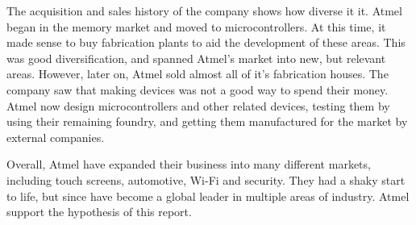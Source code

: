 The acquisition and sales history of the company shows how diverse it it.
Atmel began in the memory market and moved to microcontrollers. 
At this time, it made sense to buy fabrication plants to aid the development of these areas. 
This was good diversification, and spanned Atmel's market into new, but relevant areas.
However, later on, Atmel sold almost all of it's fabrication houses. 
The company saw that making devices was not a good way to spend their money. 
Atmel now design microcontrollers and other related devices, testing them by using their remaining foundry, and getting them manufactured for the market by external companies.

Overall, Atmel have expanded their business into many different markets, including touch screens, automotive, Wi-Fi and security. 
They had a shaky start to life, but since have become a global leader in multiple areas of industry. 
Atmel support the hypothesis of this report.

